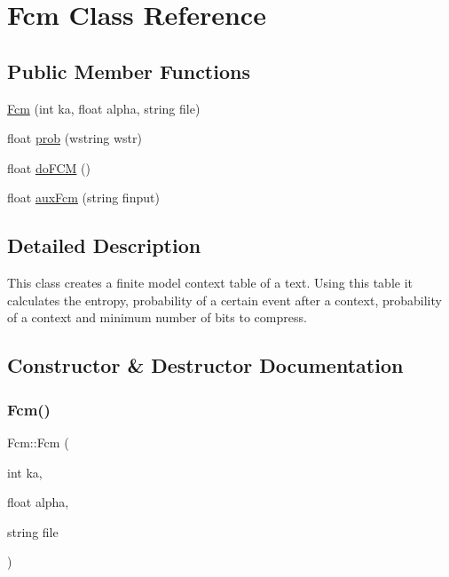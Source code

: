 \hypertarget{classFcm}{}\section{Fcm Class Reference}
\label{classFcm}
\subsection*{Public Member Functions}
\begin{DoxyCompactItemize}
\item 
\hyperlink{classFcm_acf28ce4cfb889f3d31d92c79ae2516c0}{Fcm} (int ka, float alpha, string file)
\item 
float \hyperlink{classFcm_a4c5faff6ef8a999d3bb497e2ee9564ec}{prob} (wstring wstr)
\item 
float \hyperlink{classFcm_a0efbdb9b781da543be2a9a86b73b528d}{do\+F\+CM} ()
\item 
float \hyperlink{classFcm_a46ff33d5782a0ff3e041106977917ef2}{aux\+Fcm} (string finput)
\end{DoxyCompactItemize}


\subsection{Detailed Description}
This class creates a finite model context table of a text. Using this table it calculates the entropy, probability of a certain event after a context, probability of a context and minimum number of bits to compress. 

\subsection{Constructor \& Destructor Documentation}
\mbox{\label{classFcm_acf28ce4cfb889f3d31d92c79ae2516c0}} 
\subsubsection{\texorpdfstring{Fcm()}{Fcm()}}
{\footnotesize\ttfamily Fcm\+::\+Fcm (\begin{DoxyParamCaption}\item[{int}]{ka,  }\item[{float}]{alpha,  }\item[{string}]{file }\end{DoxyParamCaption})\hspace{0.3cm}{\ttfamily [inline]}}

